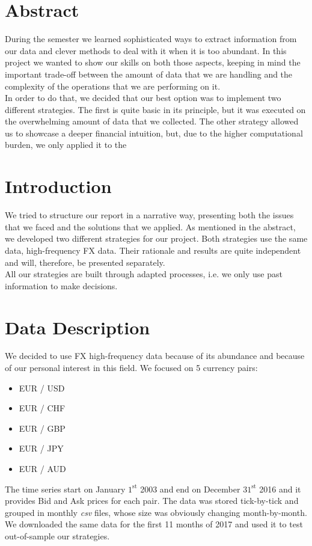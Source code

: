 \documentclass[a4paper]{article}
\begin{document}
\newpage



\section{Abstract}

During the semester we learned sophisticated ways to extract information from our data and clever methods to deal with it when it is too abundant. In this project we wanted to show our skills on both those aspects, keeping in mind the important trade-off between the amount of data that we are handling and the complexity of the operations that we are performing on it.\\
In order to do that, we decided that our best option was to implement two different strategies. The first is quite basic in its principle, but it was executed on the overwhelming amount of data that we collected. The other strategy allowed us to showcase a deeper financial intuition, but, due to the higher computational burden, we only applied it to the 


\section{Introduction}

We tried to structure our report in a narrative way, presenting both the issues that we faced and the solutions that we applied. As mentioned in the abstract, we developed two different strategies for our project. Both strategies use the same data, high-frequency FX data. Their rationale and results are quite independent and will, therefore, be presented separately.\\
All our strategies are built through adapted processes, i.e. we only use past information to make decisions.\\ 


\section{Data Description}

We decided to use FX high-frequency data because of its abundance and because of our personal interest in this field. We focused on 5 currency pairs:
\begin{itemize}
\item EUR / USD
\item EUR / CHF
\item EUR / GBP
\item EUR / JPY
\item EUR / AUD
\end{itemize}
The time series start on January $1^{\text{st}}$ 2003 and end on December $31^{\text{st}}$ 2016 and it provides Bid and Ask prices for each pair. The data was stored tick-by-tick and grouped in monthly \emph{csv} files, whose size was obviously changing month-by-month.\\
We downloaded the same data for the first 11 months of 2017 and used it to test out-of-sample our strategies.
\end{document}
